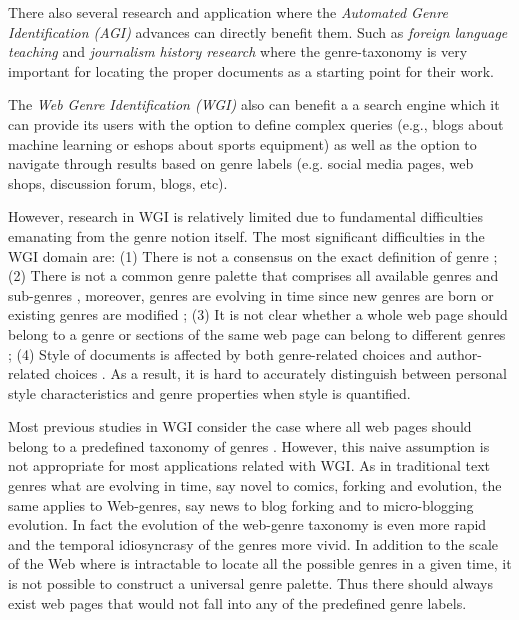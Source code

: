 \documentclass[
    11pt, %
    english, %
    singlespacing, %
    headsepline, %
]{DoctoralThesis} %
\begin{document}
There also several research and application where the \textit{Automated Genre Identification (AGI)} advances can directly benefit them. Such as \textit{foreign language teaching} and \textit{journalism history research} where the genre-taxonomy is very important for locating the proper documents as a starting point for their work.

The \textit{Web Genre Identification  (WGI)} also can benefit a a search engine which it can provide its users with the option to define complex queries (e.g., blogs about machine learning or eshops about sports equipment) as well as the option to navigate through results based on genre labels (e.g. social media pages, web shops, discussion forum, blogs, etc).

However, research in WGI is relatively limited due to fundamental difficulties emanating from the genre notion itself. The most significant difficulties in the WGI domain are: (1) There is not a consensus on the exact definition of genre \parencite{crowston2011problems}; (2) There is not a common genre palette that comprises all available genres and sub-genres \parencite{santini2011cross,mehler2010genres_on_web,mason2009n,sharoff2010web}, moreover, genres are evolving in time since new genres are born or existing genres are modified \parencite{Boese2005}; (3) It is not clear whether a whole web page should belong to a genre or sections of the same web page can belong to different genres \parencite{jebari2015combination,madjarov2015web}; (4) Style of documents is affected by both genre-related choices and author-related choices \parencite{petrenz2011stable,Sharroff2010}. As a result, it is hard to accurately distinguish between personal style characteristics and genre properties when style is quantified.

Most previous studies in WGI consider the case where all web pages should belong to a predefined taxonomy of genres \parencite{Lim2005,santini2007automatic,kanaris2009learning,jebari2014pure_URL}. However, this naive assumption is not appropriate for most applications related with WGI. As in traditional text genres what are evolving in time, say novel to comics, forking and evolution, the same applies to Web-genres, say news to blog forking and to micro-blogging evolution. In fact the evolution of the web-genre taxonomy is even more rapid and the temporal idiosyncrasy of the genres more vivid. In addition to the scale of the Web where is intractable to locate all the possible genres in a given time, it is not possible to construct a universal genre palette. Thus there should always exist web pages that would not fall into any of the predefined genre labels.
\end{document}
